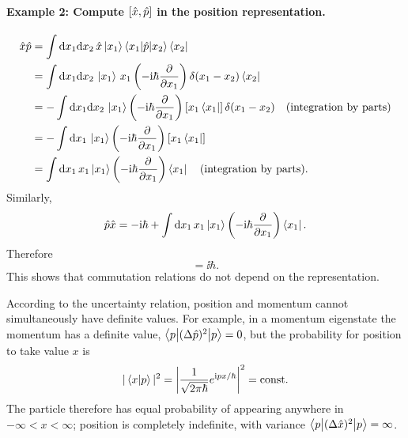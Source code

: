 \paragraph{Example 2: Compute $[\hat{x},\hat{p}]$ in the position representation.}
\begin{equation}\begin{aligned}
\hat{x}\hat{p}
&=\int\mathrm{d} x_1\mathrm{d} x_2\,
\hat{x}\left|x_1\right\rangle\left\langle x_1\middle|\hat{p}\middle|x_2\right\rangle\left\langle x_2\right|\\
&=\int\mathrm{d} x_1\mathrm{d} x_2\,\left|x_1\right\rangle\,x_1
\left(-\mathrm{i}\hbar\frac\partial{\partial x_1}\right)\delta(x_1-x_2)\left\langle x_2\right|\\
&=-\int\mathrm{d} x_1\mathrm{d} x_2\,\left|x_1\right\rangle
\left(-\mathrm{i}\hbar\frac\partial{\partial x_1}\right)[x_1\left\langle x_1\right|]\,\delta(x_1-x_2)
\quad\text{(integration by parts)}\\
&=-\int\mathrm{d} x_1\,\left|x_1\right\rangle
\left(-\mathrm{i}\hbar\frac\partial{\partial x_1}\right)[x_1\left\langle x_1\right|]\\
&=\int\mathrm{d} x_1\,x_1\left|x_1\right\rangle
\left(-\mathrm{i}\hbar\frac\partial{\partial x_1}\right)\left\langle x_1\right|
\quad\text{(integration by parts).}
\end{aligned}\end{equation}
Similarly,
\begin{equation}
\hat{p}\hat{x}=-\mathrm{i}\hbar+\int\mathrm{d} x_1\,x_1\left|x_1\right\rangle
\left(-\mathrm{i}\hbar\frac\partial{\partial x_1}\right)\left\langle x_1\right|.
\end{equation}
Therefore
\begin{equation}
[\op x,\op p]=\ii\hbar.
\end{equation}
This shows that commutation relations do not depend on the representation.

According to the uncertainty relation, position and momentum cannot simultaneously have definite values. For example, in a momentum eigenstate the momentum has a definite value, $\left\langle p\middle|(\Delta\hat{p})^2\middle|p\right\rangle=0$, but the probability for position to take value $x$ is
\begin{equation}
|\left\langle x\middle|p\right\rangle|^2=\left|\frac1{\sqrt{2\pi\hbar}}e^{\mathrm{i} px/\hbar}\right|^2
=\text{const}.
\end{equation}
The particle therefore has equal probability of appearing anywhere in $-\infty<x<\infty$; position is completely indefinite, with variance $\left\langle p\middle|(\Delta\hat{x})^2\middle|p\right\rangle=\infty$.

